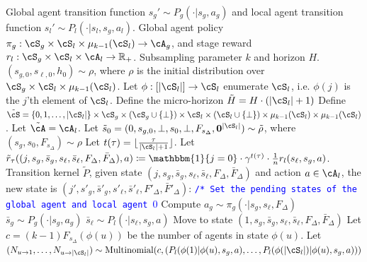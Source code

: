 \documentclass{article}
\theoremstyle{plain}
\theoremstyle{definition}
\begin{document}
\begin{algorithm}[t]
    \begin{algorithmic}
        \caption{$|\cS_l|$-chained MF-MDP for learning the local agent's best-response to policy $\pi_g:\cS_g\times\cS_l\times\mu_{k-1}(\cS_l)\to\cA_g$}
       \REQUIRE Global agent transition function $s_g' \sim P_g(\cdot|s_g, a_g)$ and local agent transition function $s_l' \sim P_l(\cdot|s_l, s_g, a_l)$.
        \REQUIRE Global agent policy $\pi_g:\cS_g\times\cS_l\times\mu_{k-1}(\cS_l) \to \cA_g$, and stage reward $r_l:\cS_g\times\cS_l\times\cA_l\to \mathbb{R}_+$.
        \REQUIRE Subsampling parameter $k$ and horizon $H$.
        \REQUIRE $(s_{g,0}, s_{\ell,0}, h_0)\sim \rho$, where $\rho$ is the initial distribution over $\cS_g\times\cS_l \times\mu_{k-1}(\cS_l)$.\medskip
                \STATE Let $\phi:[|\cS_l|]\to \cS_l$ enumerate $\cS_l$, i.e. $\phi(j)$ is the $j$'th element of $\cS_l$.
\STATE Define the micro-horizon $\tilde{H} = H\cdot (|\cS_l|+1)$
        \STATE Define $\tilde{\cS} = \{0,1,\dots,|\cS_l|\} \times \cS_g \times (\cS_g \cup \{\perp\}) \times \cS_l \times (\cS_l \cup \{\perp\}) \times \mu_{k-1}(\cS_l) \times \mu_{k-1}(\cS_l)$.
        \STATE Let $\tilde{\cA} = \cA_l$.
        \STATE Let $\tilde{s}_0 = (0, s_{g,0}, \perp, s_0, \perp, F_{s_\Delta}, \mathbf{0}^{|\cS_l|})\sim \tilde{\rho}$, where $(s_g, s_0, F_{s_\Delta}) \sim \rho$
        \STATE Let $t(\tau) = \lfloor \frac{\tau}{|\cS_l|+1}\rfloor$.
        \STATE Let $\tilde{r}_\tau((j, s_g, \bar{s}_g, s_\ell, \bar{s}_\ell, F_{\Delta}, \bar{F}_{\Delta}), a) \coloneqq \mathbbm{1}\{j=0\}\cdot \gamma^{t(\tau)}\cdot \frac{1}{n}r_l(s_\ell, s_g, a)$.
        \medskip
        \STATE Transition kernel $\tilde{P}$, given state $(j, s_g, \bar{s}_g, s_\ell, \bar{s}_\ell, F_{\Delta}, \bar{F}_\Delta)$ and action $a\in \cA_l$, the new state is $(j', s'_g, \bar{s}'_g, s'_\ell, \bar{s}'_\ell, F'_{\Delta}, \bar{F}'_\Delta)$:
        \smallskip
        \STATE \textcolor{blue}{\texttt{/* Set the pending states of the global agent and local agent $0$}}
        \STATE Compute $a_g\sim \pi_g(\cdot|s_g, s_\ell, F_{\Delta})$
        \STATE $\bar{s}_g\sim P_g(\cdot|s_g, a_g)$
        \STATE $\bar{s}_\ell \sim P_l(\cdot|s_\ell,s_g,a)$
        \STATE Move to state $(1, s_g, \bar{s}_g, s_\ell, \bar{s}_\ell, F_{\Delta}, \bar{F}_\Delta)$
        \smallskip
        \STATE Let $c = (k-1) F_{s_\Delta}(\phi(u))$ be the number of agents in state $\phi(u)$.
        \STATE Let $(N_{u\to 1}, \dots, N_{u\to |\cS_l|}) \sim \text{Multinomial}(c, \left(P_l(\phi(1)|\phi(u), s_g, a), \dots,  P_l(\phi(|\cS_l|)| \phi(u), s_g, a)\right) )$

\end{algorithmic}
\end{algorithm}
\end{document}
